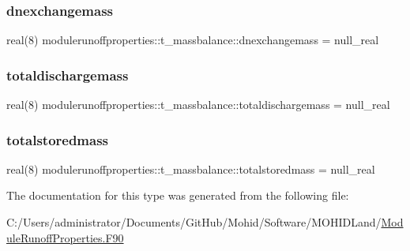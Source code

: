 \subsubsection{\texorpdfstring{dnexchangemass}{dnexchangemass}}
{\footnotesize\ttfamily real(8) modulerunoffproperties\+::t\+\_\+massbalance\+::dnexchangemass = null\+\_\+real\hspace{0.3cm}{\ttfamily [private]}}

\mbox{\label{structmodulerunoffproperties_1_1t__massbalance_a700b19895ba0ef6beb4bc912e62a473c}} 
\subsubsection{\texorpdfstring{totaldischargemass}{totaldischargemass}}
{\footnotesize\ttfamily real(8) modulerunoffproperties\+::t\+\_\+massbalance\+::totaldischargemass = null\+\_\+real\hspace{0.3cm}{\ttfamily [private]}}

\mbox{\label{structmodulerunoffproperties_1_1t__massbalance_a99bf0741d4cf9ff64fc8c08c5459c826}} 
\subsubsection{\texorpdfstring{totalstoredmass}{totalstoredmass}}
{\footnotesize\ttfamily real(8) modulerunoffproperties\+::t\+\_\+massbalance\+::totalstoredmass = null\+\_\+real\hspace{0.3cm}{\ttfamily [private]}}



The documentation for this type was generated from the following file\+:\begin{DoxyCompactItemize}
\item 
C\+:/\+Users/administrator/\+Documents/\+Git\+Hub/\+Mohid/\+Software/\+M\+O\+H\+I\+D\+Land/\mbox{\hyperlink{_module_runoff_properties_8_f90}{Module\+Runoff\+Properties.\+F90}}\end{DoxyCompactItemize}
